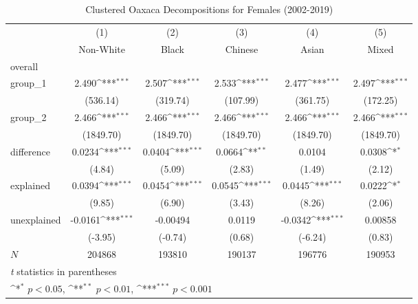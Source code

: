 \begin{table}[htbp]\centering
\def\sym#1{\ifmmode^{#1}\else\(^{#1}\)\fi}
\caption{Clustered Oaxaca Decompositions for Females (2002-2019)\label{tab1}}
\begin{tabular}{l*{5}{c}}
\hline\hline
            &\multicolumn{1}{c}{(1)}&\multicolumn{1}{c}{(2)}&\multicolumn{1}{c}{(3)}&\multicolumn{1}{c}{(4)}&\multicolumn{1}{c}{(5)}\\
            &\multicolumn{1}{c}{Non-White}&\multicolumn{1}{c}{Black}&\multicolumn{1}{c}{Chinese}&\multicolumn{1}{c}{Asian}&\multicolumn{1}{c}{Mixed}\\
\hline
overall     &                     &                     &                     &                     &                     \\
group\_1     &       2.490\sym{***}&       2.507\sym{***}&       2.533\sym{***}&       2.477\sym{***}&       2.497\sym{***}\\
            &    (536.14)         &    (319.74)         &    (107.99)         &    (361.75)         &    (172.25)         \\
group\_2     &       2.466\sym{***}&       2.466\sym{***}&       2.466\sym{***}&       2.466\sym{***}&       2.466\sym{***}\\
            &   (1849.70)         &   (1849.70)         &   (1849.70)         &   (1849.70)         &   (1849.70)         \\
difference  &      0.0234\sym{***}&      0.0404\sym{***}&      0.0664\sym{**} &      0.0104         &      0.0308\sym{*}  \\
            &      (4.84)         &      (5.09)         &      (2.83)         &      (1.49)         &      (2.12)         \\
explained   &      0.0394\sym{***}&      0.0454\sym{***}&      0.0545\sym{***}&      0.0445\sym{***}&      0.0222\sym{*}  \\
            &      (9.85)         &      (6.90)         &      (3.43)         &      (8.26)         &      (2.06)         \\
unexplained &     -0.0161\sym{***}&    -0.00494         &      0.0119         &     -0.0342\sym{***}&     0.00858         \\
            &     (-3.95)         &     (-0.74)         &      (0.68)         &     (-6.24)         &      (0.83)         \\
\hline
\(N\)       &      204868         &      193810         &      190137         &      196776         &      190953         \\
\hline\hline
\multicolumn{6}{l}{\footnotesize \textit{t} statistics in parentheses}\\
\multicolumn{6}{l}{\footnotesize \sym{*} \(p<0.05\), \sym{**} \(p<0.01\), \sym{***} \(p<0.001\)}\\
\end{tabular}
\label{tab:oaxaca_female_clustered}
\end{table}
